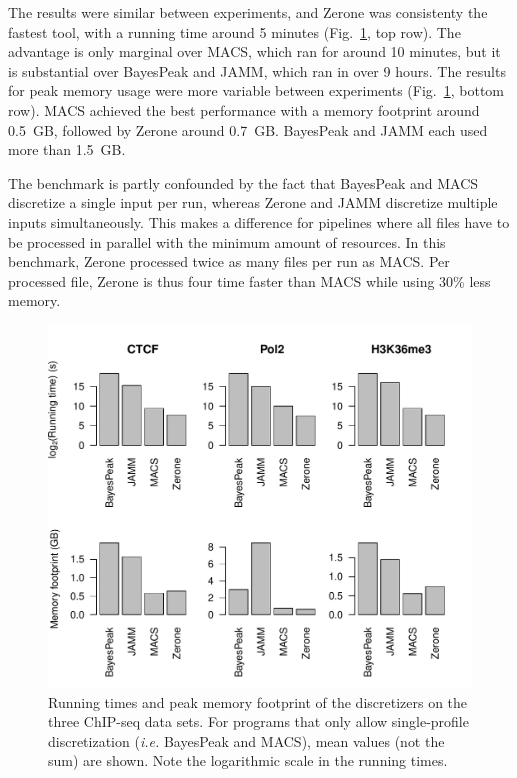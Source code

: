 \documentclass{bioinfo}
\begin{document}
The results were similar between experiments, and Zerone was
consistenty the fastest tool, with a running time around 5 minutes
(Fig.~\ref{fig:perf}, top row). The advantage is only marginal over
MACS, which ran for around 10 minutes, but it is substantial over
BayesPeak and JAMM, which ran in over 9 hours. The results for peak
memory usage were more variable between experiments (Fig.~\ref{fig:perf},
bottom row). MACS achieved the best performance with a memory
footprint around 0.5~GB, followed by Zerone around 0.7~GB.
BayesPeak and JAMM each used more than 1.5~GB.

The benchmark is partly confounded by the fact that BayesPeak and MACS
discretize a single input per run, whereas Zerone and JAMM discretize
multiple inputs simultaneously. This makes a difference for pipelines
where all files have to be processed in parallel with the minimum
amount of resources. In this benchmark, Zerone processed twice as
many files per run as MACS. Per processed file, Zerone is thus
four time faster than MACS while using 30\% less memory.

\begin{figure}[!tpb]
\centerline{\includegraphics[scale=0.5]{performance.pdf}}
\caption{
  Running times and peak memory footprint of the
  discretizers on the three ChIP-seq data sets. For programs that only
  allow single-profile discretization (\textit{i.e.} BayesPeak and MACS),
  mean values (not the sum) are shown. Note the logarithmic scale in the
  running times.
}\label{fig:perf}
\end{figure}
\end{document}
